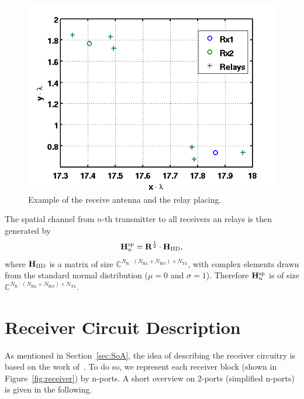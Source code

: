\begin{figure}[h]
\begin{center}
\includegraphics[width=\textwidth]{images/antennae_position.png}
\caption{Example of the receive antenna and the relay placing.}
\label{fig:antenna_placing}
\end{center}
\end{figure}

The spatial channel from $n$-th transmitter to all receivers an relays is then generated by
\begin{equation}
\label{eq:spatial_channel}
\mathbf{H}_{n}^{\text{sp}} = \mathbf{R}^{\frac{1}{2}}\cdot\mathbf{H}_\text{IID},
\end{equation} 
where $\mathbf{H}_\text{IID}$ is a matrix of size $\mathbb{C}^{N_\text{R}\cdot \left(N_\text{Rx} + N_\text{Rel}\right) \times N_\text{Tx}}$, with complex elements drawn from the standard normal distribution ($\mu = 0$ and $\sigma = 1$).
Therefore $\mathbf{H}_{n}^{\text{sp}}$ is of size $\mathbb{C}^{N_\text{R}\cdot \left(N_\text{Rx} + N_\text{Rel}\right) \times N_\text{Tx}}$.


\section{Receiver Circuit Description}
\label{sec:network_description}
As mentioned in Section~\ref{sec:SoA}, the idea of describing the receiver circuitry is based on the work of~\cite{Nossek}.
To do so, we represent each receiver block (shown in Figure~\ref{fig:receiver}) by n-ports.
A short overview on 2-ports (simplified n-ports) is given in the following.

